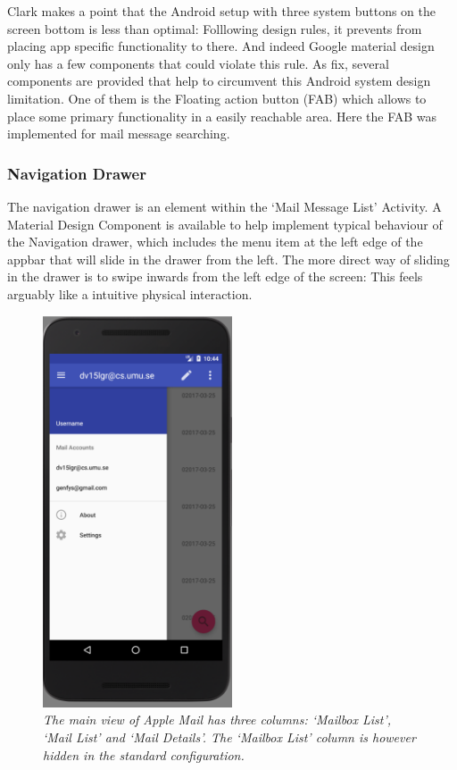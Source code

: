 \documentclass[a4paper,11pt,twoside]{article}
\begin{document}
Clark makes a point that the Android setup with three system buttons on the
screen bottom is less than optimal: Folllowing design rules, it prevents from
placing app specific functionality to there. And indeed Google material design
only  has a few components that could violate this rule. As fix, several
components are provided that help to circumvent this Android system design
limitation. One of them is the Floating action button (FAB) which allows to
place some primary functionality in a easily reachable area. Here the FAB was
implemented for mail message searching.

\subsubsection{Navigation Drawer}
The navigation drawer is an element within the `Mail Message List' Activity. A
Material Design Component is available to help implement typical behaviour of
the Navigation drawer, which includes the menu item at the left edge of the appbar
that will slide in the drawer from the left. The more direct way of
sliding in the drawer is to swipe inwards from the left edge of the screen: This
feels arguably like a intuitive physical interaction.

\begin{figure}
  \label{fig:nav_drawer}
  \centering
    \includegraphics[width=0.5\textwidth]{nav_drawer}
    \caption{\textit{The main view of Apple Mail has three columns: `Mailbox List',
    `Mail List' and `Mail Details'. The `Mailbox List' column is however
    hidden in the standard configuration.}}
\end{figure}
\end{document}
